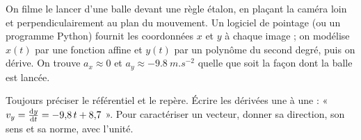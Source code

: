 \begin{experience}
On filme le lancer d'une balle devant une règle étalon, en plaçant la caméra loin et perpendiculairement au plan du
mouvement. Un logiciel de pointage (ou un programme Python) fournit les coordonnées $x$ et $y$ à chaque image ; on
modélise $x(t)$ par une fonction affine et $y(t)$ par un polynôme du second degré, puis on dérive. On trouve
$a_x\approx0$ et $a_y\approx\qty{-9,8}{m.s^{-2}}$ quelle que soit la façon dont la balle est lancée.
\end{experience}
\begin{rediger}
Toujours préciser le référentiel et le repère. Écrire les dérivées une à une : « $v_y=\frac{\mathrm{d}y}{\mathrm{d}t}=-9{,}8\,t+8{,}7$ ». Pour
caractériser un vecteur, donner sa direction, son sens et sa norme, avec l'unité.
\end{rediger}
\exercices

